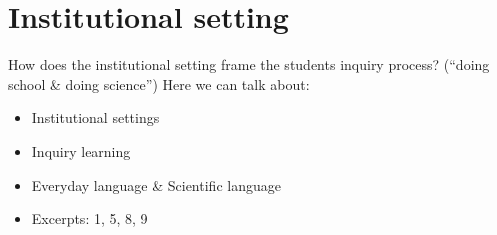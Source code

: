 \section{Institutional setting}
How does the institutional setting frame the students inquiry process? (“doing school \& doing science”)
Here we can talk about: 
\begin{itemize}
\item{Institutional settings}
\item{Inquiry learning}
\item{Everyday language \& Scientific language}
\item{Excerpts: 1, 5, 8, 9}
\end{itemize}
